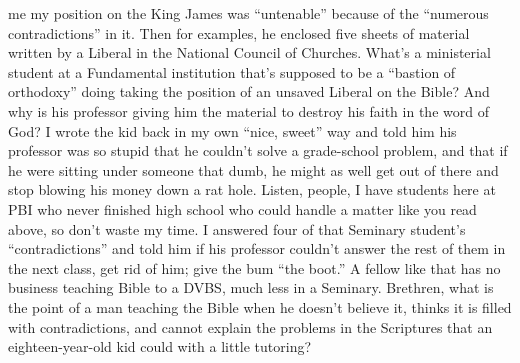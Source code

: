 {me my position on the King James was
“untenable” because of the “numerous
contradictions” in it. Then for examples, he
enclosed five sheets of material written by a
Liberal in the National Council of Churches.
What’s a ministerial student at a Fundamental
institution that’s supposed to be a “bastion of
orthodoxy” doing taking the position of an
unsaved Liberal on the Bible? And why is his
professor giving him the material to destroy
his faith in the word of God?
I wrote the kid back in my own “nice,
sweet” way and told him his professor was so
stupid that he couldn’t solve a grade-school
problem, and that if he were sitting under
someone that dumb, he might as well get out of
there and stop blowing his money down a rat
hole. Listen, people, I have students here at PBI
who never finished high school who could
handle a matter like you read above, so don’t
waste my time.
I answered four of that Seminary student’s
“contradictions” and told him if his professor
couldn’t answer the rest of them in the next
class, get rid of him; give the bum “the boot.” A
fellow like that has no business teaching Bible
to a DVBS, much less in a Seminary. Brethren,
what is the point of a man teaching the Bible
when he doesn’t believe it, thinks it is filled with
contradictions, and cannot explain the problems
in the Scriptures that an eighteen-year-old kid
could with a little tutoring?}
